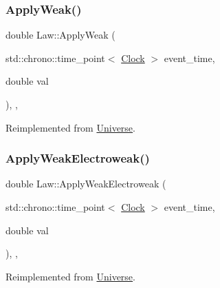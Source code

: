 \mbox{\label{classLaw_a96ddd42403e3665c6070283ac201658d}} 
\subsubsection{\texorpdfstring{Apply\+Weak()}{ApplyWeak()}}
{\footnotesize\ttfamily double Law\+::\+Apply\+Weak (\begin{DoxyParamCaption}\item[{std\+::chrono\+::time\+\_\+point$<$ \mbox{\hyperlink{universe_8h_a0ef8d951d1ca5ab3cfaf7ab4c7a6fd80}{Clock}} $>$}]{event\+\_\+time,  }\item[{double}]{val }\end{DoxyParamCaption})\hspace{0.3cm}{\ttfamily [inline]}, {\ttfamily [final]}, {\ttfamily [virtual]}}



Reimplemented from \mbox{\hyperlink{classUniverse_a6d1226b3adec3c42a833afdbb6a65a92}{Universe}}.

\mbox{\label{classLaw_ae8a5d1d09686d79f7814c8800791460b}} 
\subsubsection{\texorpdfstring{Apply\+Weak\+Electroweak()}{ApplyWeakElectroweak()}}
{\footnotesize\ttfamily double Law\+::\+Apply\+Weak\+Electroweak (\begin{DoxyParamCaption}\item[{std\+::chrono\+::time\+\_\+point$<$ \mbox{\hyperlink{universe_8h_a0ef8d951d1ca5ab3cfaf7ab4c7a6fd80}{Clock}} $>$}]{event\+\_\+time,  }\item[{double}]{val }\end{DoxyParamCaption})\hspace{0.3cm}{\ttfamily [inline]}, {\ttfamily [final]}, {\ttfamily [virtual]}}



Reimplemented from \mbox{\hyperlink{classUniverse_a46a906baabb63e5d31f8b48ea1fae52e}{Universe}}.

\mbox{\label{classLaw_ab30a86ef88a85e13d3e598caa45bff05}} 
